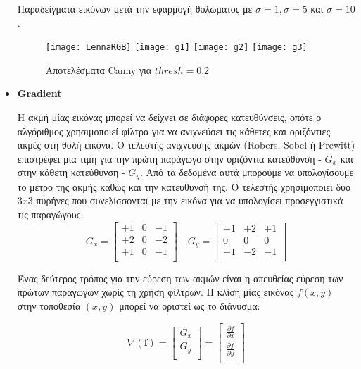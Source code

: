 \begin{itemize}[label={},leftmargin=*]
\begin{algorithm}[H]
   \DontPrintSemicolon
   \end{algorithm}
\DecMargin{1em}
\hfill \break
\noindent Παραδείγματα εικόνων μετά την εφαρμογή θολώματος με $\sigma = 1, \sigma = 5$ και $\sigma = 10$.

\begin{figure}[H]
\centering
{}%
  {\texttt{[image: LennaRGB]}}
  {\texttt{[image: g1]}}
  {\texttt{[image: g2]}}
  {\texttt{[image: g3]}}
\caption{Αποτελέσματα Canny για $thresh=0.2$}
\end{figure}
\newpage
\item \textbf{Gradient}

Η ακμή μίας εικόνας μπορεί να δείχνει σε διάφορες κατευθύνσεις, οπότε ο αλγόριθμος χρησιμοποιεί φίλτρα για να ανιχνεύσει  τις κάθετες και οριζόντιες ακμές στη θολή εικόνα. Ο τελεστής ανίχνευσης ακμών (Robers, Sobel ή Prewitt) επιστρέφει μια τιμή για την πρώτη παράγωγο στην οριζόντια κατεύθυνση - $G_x$ και στην κάθετη κατεύθυνση - $G_y$. Από τα δεδομένα αυτά μπορούμε να υπολογίσουμε το μέτρο της ακμής καθώς και την κατεύθυνσή της. Ο τελεστής χρησιμοποιεί δύο $3x3$ πυρήνες που συνελίσσονται με την εικόνα για να υπολογίσει προσεγγιστικά τις παραγώγους.
\[
  G_x=
  \begin{bmatrix}
     +1 & 0 & -1 \\
    +2 & 0 & -2 \\
    +1 & 0 & -1 \\
  \end{bmatrix}\quad
  G_y=
  \begin{bmatrix}
    +1 & +2 &+1 \\
    0 & 0 & 0 \\
    -1 & -2 & -1 \\
  \end{bmatrix}
\]

Ένας δεύτερος τρόπος για την εύρεση των ακμών είναι η απευθείας εύρεση των πρώτων παραγώγων χωρίς τη χρήση φίλτρων. Η κλίση μίας εικόνας $f(x,y)$ στην τοποθεσία $(x,y)$ μπορεί να οριστεί ως το διάνυσμα:

\begin{equation}
 \nabla(\boldsymbol{f}) = \begin{bmatrix}
    			 G_x \\
   				 G_y \\
  \end{bmatrix} =
  \begin{bmatrix}
    			 \frac{\partial f}{\partial x} \\
   				 \frac{\partial f}{\partial y} \\
  \end{bmatrix}
\end{equation}


\end{itemize}
